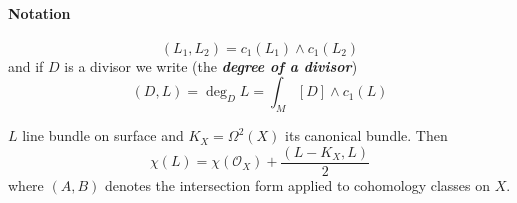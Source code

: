\paragraph{Notation}
\[(L_1,L_2)=c_1(L_1)\wedge c_1(L_2)\]
and if $D$ is a divisor we write (the \textit{\textbf{degree of a divisor}})
\[(D,L)=\operatorname{deg}_DL=\int_{M}[D]\wedge c_1(L)\]

\begin{thm}\leavevmode
	$L$ line bundle on surface and $K_{X}=\Omega^{2}(X)$ its canonical bundle. Then
	\begin{equation*}\label{eq:rrh}
\chi(L)=\chi(\mathcal{O}_{X})+\frac{(L-K_X,L)}{2}
	\end{equation*}
	where $(A,B)$ denotes the intersection form applied to cohomology classes on $X$.
\end{thm}

